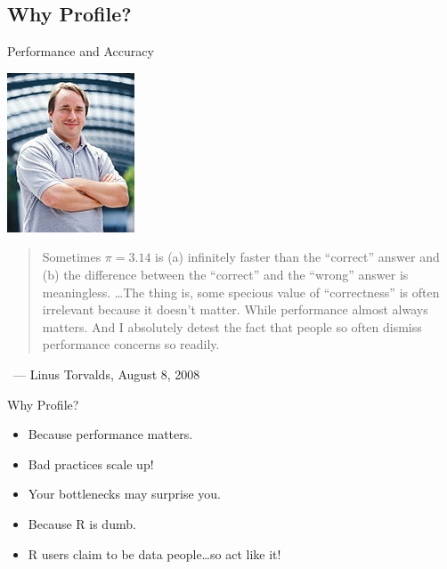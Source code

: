 \subsection{Why Profile?}
\makesubcontentsslidessec


\begin{frame}
  \begin{block}{Performance and Accuracy}
  \begin{minipage}[t]{.25\textwidth}
    \vspace{0pt}
    \includegraphics[scale=.7]{../common/pics/linus}
  \end{minipage}
  \hfill
  \begin{minipage}[t]{.73\textwidth}
    \vspace{0pt}
    \begin{quote}
      Sometimes $\pi = 3.14$ is (a) infinitely faster than the ``correct'' 
answer and (b) the difference between the ``correct'' and the ``wrong'' answer 
is meaningless. \dots The thing is, some specious value of ``correctness'' is 
often irrelevant because it doesn't matter. While performance almost always 
matters. And I absolutely detest the fact that people so often dismiss 
performance concerns so readily. 
    \end{quote}
    \ \hfill --- Linus Torvalds, August 8, 2008
  \end{minipage}
  \end{block}
\end{frame}



\begin{frame}
  \begin{block}{Why Profile?}
  \begin{itemize}
    \item Because performance matters.
    \item Bad practices scale up!
    \item Your bottlenecks may surprise you.
    \item Because R is dumb.
    \item R users claim to be data people\dots so act like it!
  \end{itemize}
  \end{block}
\end{frame}


